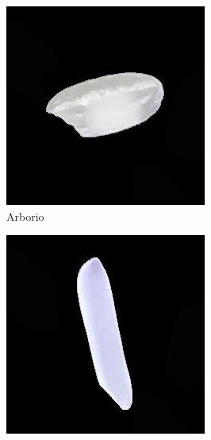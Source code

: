 \documentclass{article}
\begin{document}
\begin{figure} [!htb]
	\centering
	\begin{subfigure}[b]{0.18\textwidth}
		\includegraphics[width= \textwidth]{fg/Arborio.jpg}
		\caption{Arborio}
	\end{subfigure}
	\begin{subfigure}[b]{0.18\textwidth}
		\includegraphics[width= \textwidth]{fg/Basmati.jpg}

\end{subfigure}
\end{figure}
\end{document}
